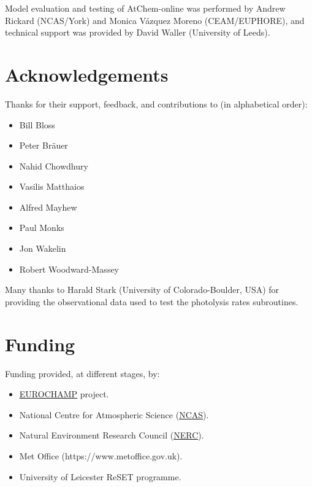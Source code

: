 Model evaluation and testing of AtChem-online was performed by Andrew
Rickard (NCAS/York) and Monica V{\'a}zquez Moreno (CEAM/EUPHORE), and
technical support was provided by David Waller (University of Leeds).

\section{Acknowledgements} \label{sec:acknowledgements}

Thanks for their support, feedback, and contributions to (in alphabetical order):

\begin{itemize}
\item Bill Bloss
\item Peter Br{\"a}uer
\item Nahid Chowdhury
\item Vasilis Matthaios
\item Alfred Mayhew
\item Paul Monks
\item Jon Wakelin
\item Robert Woodward-Massey
\end{itemize}

Many thanks to Harald Stark (University of Colorado-Boulder, USA) for providing
the observational data used to test the photolysis rates subroutines.

\section{Funding} \label{sec:funding}

Funding provided, at different stages, by:

\begin{itemize}
\item \href{https://www.eurochamp.org}{EUROCHAMP} project.
\item National Centre for Atmospheric Science (\href{https://www.ncas.ac.uk}{NCAS}).
\item Natural Environment Research Council (\href{https://nerc.ukri.org}{NERC}).
\item Met Office (https://www.metoffice.gov.uk).
\item University of Leicester ReSET programme.
\end{itemize}
